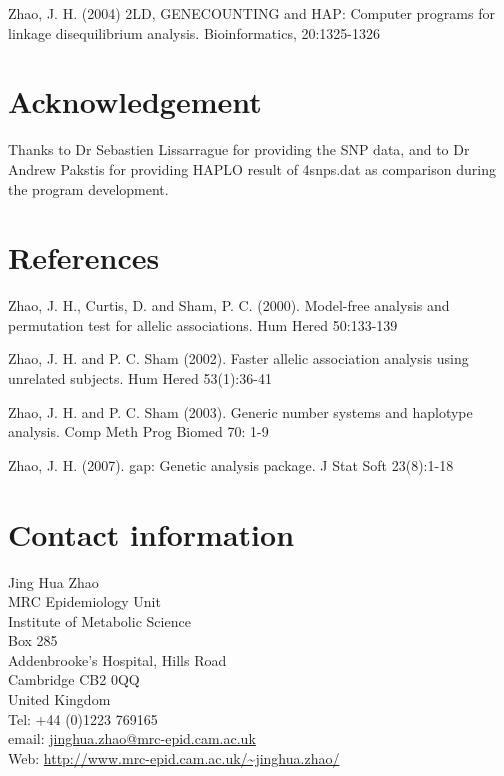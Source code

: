 \documentclass[11pt]{article}
\begin{document}
\medskip\noindent
Zhao, J. H. (2004) 2LD, GENECOUNTING and HAP: Computer programs for linkage
disequilibrium analysis. Bioinformatics, 20:1325-1326


\section{Acknowledgement}

\medskip\noindent Thanks to Dr Sebastien Lissarrague for providing the SNP
data, and to Dr Andrew Pakstis for providing HAPLO result of
4snps.dat as comparison during the program development.


\section{References}

\medskip
\noindent
Zhao, J. H., Curtis, D. and Sham, P. C. (2000). Model-free analysis
and permutation test for allelic associations. Hum Hered 50:133-139

\medskip
\noindent
Zhao, J. H. and P. C. Sham (2002). Faster allelic association analysis using
unrelated subjects.  Hum Hered 53(1):36-41

\medskip
\noindent
Zhao, J. H. and P. C. Sham (2003). Generic number systems and haplotype
analysis. Comp Meth Prog Biomed 70: 1-9

\medskip
\noindent Zhao, J. H. (2007). gap: Genetic analysis package. J Stat
Soft 23(8):1-18


\section{Contact information}

\medskip\noindent
Jing Hua Zhao\\
MRC Epidemiology Unit\\
Institute of Metabolic Science\\
Box 285\\
Addenbrooke's Hospital, Hills Road\\
Cambridge CB2 0QQ\\
United Kingdom\\

\noindent Tel: +44 (0)1223 769165\\
email: \href{mailto:jinghua.zhao@mrc-epid.cam.ac.uk}{jinghua.zhao@mrc-epid.cam.ac.uk}\\
Web: \url{http://www.mrc-epid.cam.ac.uk/~jinghua.zhao/}

\bigskip{}
\end{document}
